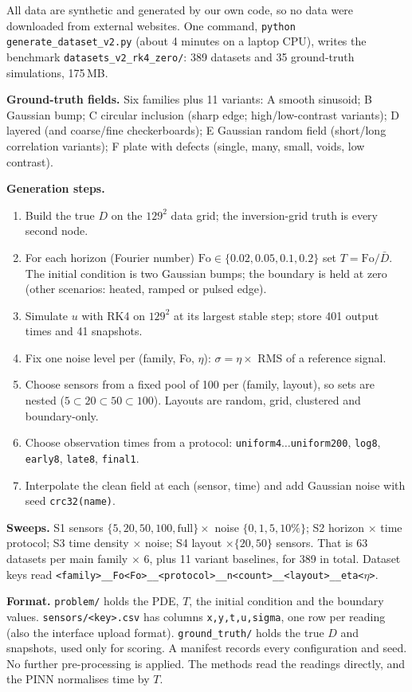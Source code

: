 \documentclass[twoside,english]{article}
\begin{document}
All data are synthetic and generated by our own code, so no data were downloaded from external websites. One command, \texttt{python generate\_dataset\_v2.py} (about 4 minutes on a laptop CPU), writes the benchmark \texttt{datasets\_v2\_rk4\_zero/}: 389 datasets and 35 ground-truth simulations, 175\,MB.

\textbf{Ground-truth fields.} Six families plus 11 variants: A smooth sinusoid; B Gaussian bump; C circular inclusion (sharp edge; high/low-contrast variants); D layered (and coarse/fine checkerboards); E Gaussian random field (short/long correlation variants); F plate with defects (single, many, small, voids, low contrast).

\textbf{Generation steps.}
\begin{enumerate}
\item Build the true $D$ on the $129^2$ data grid; the inversion-grid truth is every second node.
\item For each horizon (Fourier number) $\mathrm{Fo}\in\{0.02,0.05,0.1,0.2\}$ set $T=\mathrm{Fo}/\bar D$. The initial condition is two Gaussian bumps; the boundary is held at zero (other scenarios: heated, ramped or pulsed edge).
\item Simulate $u$ with RK4 on $129^2$ at its largest stable step; store 401 output times and 41 snapshots.
\item Fix one noise level per (family, Fo, $\eta$): $\sigma=\eta\times$ RMS of a reference signal.
\item Choose sensors from a fixed pool of 100 per (family, layout), so sets are nested ($5\subset20\subset50\subset100$). Layouts are random, grid, clustered and boundary-only.
\item Choose observation times from a protocol: \texttt{uniform4}$\ldots$\texttt{uniform200}, \texttt{log8}, \texttt{early8}, \texttt{late8}, \texttt{final1}.
\item Interpolate the clean field at each (sensor, time) and add Gaussian noise with seed \texttt{crc32(name)}.
\end{enumerate}

\textbf{Sweeps.} S1 sensors $\{5,20,50,100,\text{full}\}\times$ noise $\{0,1,5,10\%\}$; S2 horizon $\times$ time protocol; S3 time density $\times$ noise; S4 layout $\times\{20,50\}$ sensors. That is 63 datasets per main family $\times$ 6, plus 11 variant baselines, for 389 in total. Dataset keys read \texttt{<family>\_\_Fo<Fo>\_\_<protocol>\_\_n<count>\_\_<layout>\_\_eta<$\eta$>}.

\textbf{Format.} \texttt{problem/} holds the PDE, $T$, the initial condition and the boundary values. \texttt{sensors/<key>.csv} has columns \texttt{x,y,t,u,sigma}, one row per reading (also the interface upload format). \texttt{ground\_truth/} holds the true $D$ and snapshots, used only for scoring. A manifest records every configuration and seed. No further pre-processing is applied. The methods read the readings directly, and the PINN normalises time by $T$.
\end{document}
